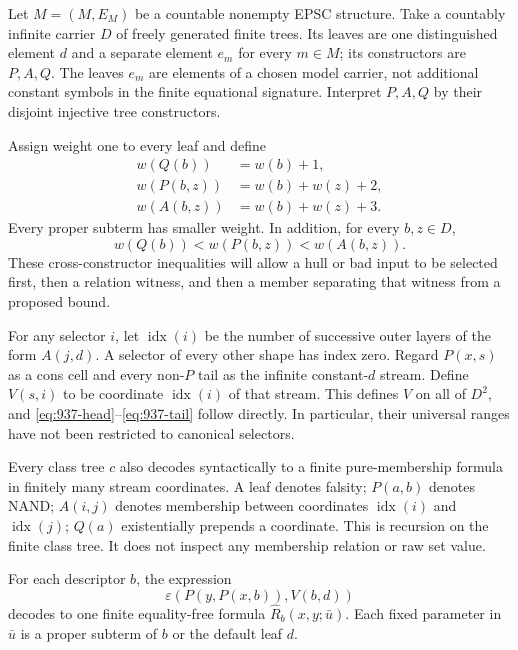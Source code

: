 Let \(M=(M,E_M)\) be a countable nonempty EPSC structure.
Take a countably infinite carrier \(D\) of freely generated finite trees.
Its leaves are one distinguished element \(d\) and a separate element
\(e_m\) for every \(m\in M\); its constructors are \(P,A,Q\).
The leaves \(e_m\) are elements of a chosen model carrier, not additional
constant symbols in the finite equational signature.  Interpret
\(P,A,Q\) by their disjoint injective tree constructors.

Assign weight one to every leaf and define
\begin{equation}
 \begin{split}
 w(Q(b))&=w(b)+1,\\
 w(P(b,z))&=w(b)+w(z)+2,\\
 w(A(b,z))&=w(b)+w(z)+3.
 \end{split}
 \label{eq:937-weights}
\end{equation}
Every proper subterm has smaller weight.  In addition, for every
\(b,z\in D\),
\begin{equation}
              w(Q(b))<w(P(b,z))<w(A(b,z)).
              \label{eq:937-cross-order}
\end{equation}
These cross-constructor inequalities will allow a hull or bad input
to be selected first, then a relation witness, and then a member
separating that witness from a proposed bound.

For any selector \(i\), let \(\operatorname{idx}(i)\) be the number of
successive outer layers of the form \(A(j,d)\).  A selector of every
other shape has index zero.  Regard \(P(x,s)\) as a cons cell and
every non-\(P\) tail as the infinite constant-\(d\) stream.
Define \(V(s,i)\) to be coordinate \(\operatorname{idx}(i)\) of that
stream.  This defines \(V\) on all of \(D^2\), and
\eqref{eq:937-head}--\eqref{eq:937-tail} follow directly.
In particular, their universal ranges have not been restricted to
canonical selectors.

Every class tree \(c\) also decodes syntactically to a finite
pure-membership formula in finitely many stream coordinates.
A leaf denotes falsity; \(P(a,b)\) denotes NAND; \(A(i,j)\) denotes
membership between coordinates \(\operatorname{idx}(i)\) and
\(\operatorname{idx}(j)\); \(Q(a)\) existentially prepends a coordinate.
This is recursion on the finite class tree.  It does not inspect any
membership relation or raw set value.

\begin{lemma}
\label{lem:937-descent}
For each descriptor \(b\), the expression
\[
       \varepsilon(P(y,P(x,b)),V(b,d))
\]
decodes to one finite equality-free formula
\(\widehat R_b(x,y;\bar u)\).  Each fixed parameter in \(\bar u\)
is a proper subterm of \(b\) or the default leaf \(d\).
\end{lemma}

